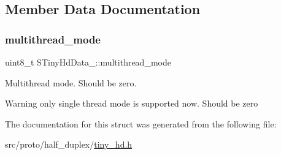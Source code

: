 \subsection{Member Data Documentation}
\mbox{\label{structSTinyHdData___a37dca10adb0dd210f02365b7fa20a598}} 
\subsubsection{\texorpdfstring{multithread\+\_\+mode}{multithread\_mode}}
{\footnotesize\ttfamily uint8\+\_\+t S\+Tiny\+Hd\+Data\+\_\+\+::multithread\+\_\+mode}



Multithread mode. Should be zero. 

\begin{DoxyWarning}{Warning}
only single thread mode is supported now. Should be zero 
\end{DoxyWarning}


The documentation for this struct was generated from the following file\+:\begin{DoxyCompactItemize}
\item 
src/proto/half\+\_\+duplex/\hyperlink{tiny__hd_8h}{tiny\+\_\+hd.\+h}\end{DoxyCompactItemize}
